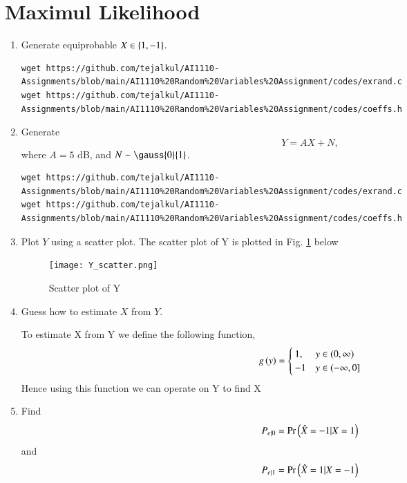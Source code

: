 \documentclass[journal,12pt,twocolumn]{IEEEtran}
\renewcommand\thesection{\arabic{section}}
\begin{document}
\section{Maximul Likelihood}
\begin{enumerate}[label=\thesection.\arabic*
,ref=\thesection.\theenumi]
\item Generate equiprobable $X \in \left\{1,-1\right\}$.

\solution
\begin{lstlisting}
wget https://github.com/tejalkul/AI1110-Assignments/blob/main/AI1110%20Random%20Variables%20Assignment/codes/exrand.c
wget https://github.com/tejalkul/AI1110-Assignments/blob/main/AI1110%20Random%20Variables%20Assignment/codes/coeffs.h
\end{lstlisting}
\item Generate 
\begin{equation}
Y = AX+N,
\end{equation}
		where $A = 5$ dB,  and $N \sim \gauss{0}{1}$.

\solution
\begin{lstlisting}
wget https://github.com/tejalkul/AI1110-Assignments/blob/main/AI1110%20Random%20Variables%20Assignment/codes/exrand.c
wget https://github.com/tejalkul/AI1110-Assignments/blob/main/AI1110%20Random%20Variables%20Assignment/codes/coeffs.h
\end{lstlisting}
	\item Plot $Y$ using a scatter plot.
The scatter plot of Y is plotted in Fig. \ref{Fig:Y_scatter} below 

\solution
\begin{figure}[!ht]
\texttt{[image: Y\_scatter.png]}
\caption{Scatter plot of Y}
\label{Fig:Y_scatter}
\end{figure} 

	\item Guess how to estimate $X$ from $Y$.
	
	\solution
	
	To estimate X from Y we define the following function,
	\begin{align}  
g\left(y\right) = 
\begin{cases}
1, & y \in (0,\infty)\\
-1 & y \in (-\infty,0] \\
\end{cases}
\end{align}
Hence using this function we can operate on Y to find X
\item
\label{ml-ch4_sim}
Find 
\begin{equation}
	P_{e|0} = \Pr\left(\hat{X} = -1|X=1\right)
\end{equation}
and 
\begin{equation}
	P_{e|1} = \Pr\left(\hat{X} = 1|X=-1\right)
\end{equation}


\end{enumerate}
\end{document}
